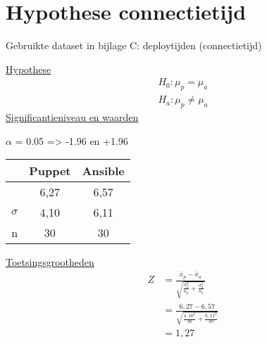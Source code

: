 \section*{Hypothese connectietijd}
\label{wis:hypotheseconnectietijd}

Gebruikte dataset in bijlage C: deploytijden (connectietijd) %

\underline{Hypothese}
\begin{align*}
H_0:  \mu_p = \mu_a \\
H_a: \mu_p\neq \mu_a 
\end{align*}
\underline{Significantieniveau en waarden} 

 $\alpha$ = 0.05 => -1.96 en +1.96 \newline

		\begin{tabular}{ r |c |c }
			& Puppet & Ansible\\\hline
			\unexpanded{$ \bar x  $} &  6,27 & 6,57\\ \hline
			$\sigma$ & 4,10 & 6,11\\ \hline
			n &  30 &  30

\end{tabular}


\underline{Toetsingsgrootheden}
\begin{equation} \label{eq1}
\begin{split}
Z &= \tfrac{\bar x_p - \bar x_a}{\sqrt{\tfrac{\sigma_p^2}{n_p}+\tfrac{\sigma_a^2}{n_a}}}\\
& = \tfrac{ 6,27 - 6,57}{\sqrt{\tfrac{ 4,10 ^2}{30}+\tfrac{ 6,11^2}{30}}} \\
& = 1,27
\end{split}
\end{equation}
